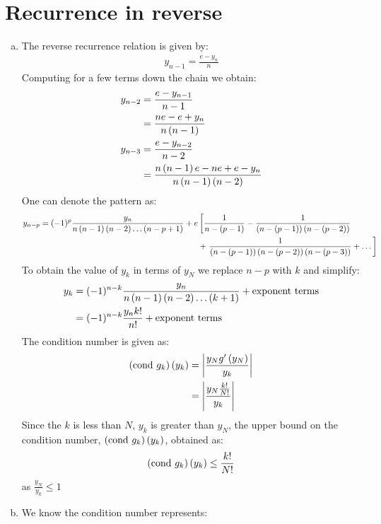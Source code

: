 \section{Recurrence in reverse}
\begin{enumerate}[(a)]
	\item The reverse recurrence relation is given by:
			\begin{align*}
				y_{n-1} = \frac{e - y_{n}}{n}
			\end{align*}
		Computing for a few terms down the chain we obtain:
			\begin{align*}
				y_{n-2} &= 	\frac{e - y_{n-1}}{n-1}\\
						&= 	\frac{ne - e + y_n}{n\left({n-1}\right)}\\
				y_{n-3}	&=	\frac{e - y_{n-2}}{n-2}\\
						&=	\frac{n\left({n-1}\right)e -ne + e- y_n}{n\left({n-1}\right)\left({n-2}\right)}
			\end{align*}
		One can denote the pattern as:
			\begin{align*}
				y_{n-p} = (-1)^{p} \frac{y_n}{n\left({n-1}\right)\left({n-2}\right)\dots\left({n-p+1}\right)} + e &\left[\frac{1}{n-\left({p-1}\right)} - \frac{1}{\left({n-\left({p-1}\right)}\right)\left({n-\left({p-2}\right)}\right)}\right.\\
																					&+ \left.\frac{1}{\left({n-\left({p-1}\right)}\right)\left({n-\left({p-2}\right)}\right)\left({n-\left({p-3}\right)}\right)} + \dots \right]
			\end{align*}
		To obtain the value of $y_k$ in terms of $y_N$ we replace $n-p$ with $k$ and simplify:
			\begin{align*}
				y_k &= (-1)^{n-k} \frac{y_n}{n\br{n-1}\br{n-2}\dots\br{k+1}} + \mt{exponent \ terms}\\
					&=(-1)^{n-k} \frac{y_n k!}{n!} + \mt{exponent \ terms}
			\end{align*}
			The condition number is given as:
			\begin{align*}
				\left({\mathrm{cond} \ g_k}\right)\left({y_k}\right) 	&= \left|\frac{y_N g'\left({y_N}\right)}{y_k}\right| \\
												&= \left|\frac{y_N \frac{k!}{N!}}{y_k}\right|
			\end{align*}
			Since the $k$ is less than $N$, $y_k$ is greater than $y_N$, the upper bound on the condition number, $\left({\mathrm{cond} \ g_k}\right)\left({y_k}\right)$, obtained as:
			\begin{align*}
				\left({\mathrm{cond} \ g_k}\right)\left({y_k}\right) \leq \frac{k!}{N!}
			\end{align*}
			as $\frac{y_N}{y_k} \leq 1$
	\item We know the condition number represents:
			\begin{align*}

\end{align*}
\end{enumerate}
